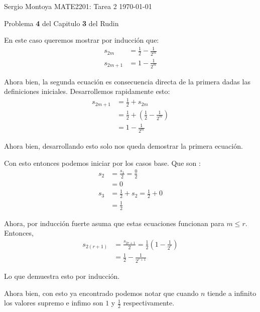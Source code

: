 \documentclass[12pt]{article}
\newenvironment{ex}[2][Ejercicio]{\begin{trivlist}
\item[\hskip \labelsep {\bfseries #1}\hskip \labelsep {\bfseries #2.}]}{\end{trivlist}}
\newenvironment{sol}[1][Solución]{\begin{trivlist}
\item[\hskip \labelsep {\bfseries #1:}]}{\end{trivlist}}
\begin{document}

\noindent Sergio Montoya \hfill {\Large MATE2201: Tarea 2} \hfill \today

\begin{ex}{1}
  Problema \textbf{4} del Capitulo \textbf{3} del Rudin
\end{ex}
\begin{sol}
  En este caso queremos mostrar por inducción que:
  \begin{align*}
    s_{2m} &= \frac{1}{2} - \frac{1}{2^m}\\
    s_{2m + 1} &= 1 - \frac{1}{2^m}
  \end{align*}

  Ahora bien, la segunda ecuación es consecuencia directa de la primera dadas las definiciones iniciales. Desarrollemos rapidamente esto:
  \begin{align*}
    s_{2m + 1} &= \frac{1}{2} + s_{2m}\\
    &= \frac{1}{2} + \left(\frac{1}{2} - \frac{1}{2^m}\right)\\
    &= 1 - \frac{1}{2^m}
  \end{align*}

  Ahora bien, desarrollando esto solo nos queda demostrar la primera ecuación.

  Con esto entonces podemos iniciar por los casos base. Que son :
  \begin{align*}
    s_{2} &= \frac{s_1}{2} = \frac{0}{2} \\
    &= 0\\
    s_3 &= \frac{1}{2} + s_2 = \frac{1}{2} + 0 \\
    &= \frac{1}{2}
  \end{align*}

  Ahora, por inducción fuerte asuma que estas ecuaciones funcionan para $m\le r$. Entonces,
  \begin{align*}
    s_{2(r + 1)} &= \frac{s_{2r + 1}}{2} = \frac{1}{2} \left(1 - \frac{1}{2^r}\right)\\
    &= \frac{1}{2} - \displaystyle\frac{1}{2^{r + 1}}
  \end{align*}

  Lo que demuestra esto por inducción.

  Ahora bien, con esto ya encontrado podemos notar que cuando $n$ tiende a infinito los valores supremo e infimo son $1$ y $\frac{1}{2}$ respectivamente.
\end{sol}
\end{document}
